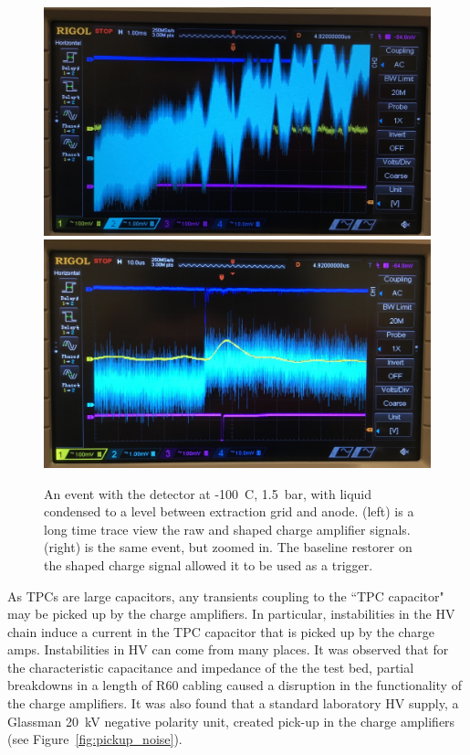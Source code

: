  \begin{figure}[htbp]
\begin{center}
\includegraphics[width = \halffig, keepaspectratio]{figures/testbed/baseline_wander.jpg}
\includegraphics[width = \halffig, keepaspectratio]{figures/testbed/baseline_wander_zoom.jpg}
\caption{An event with the detector at  -100~C, 1.5~bar, with liquid condensed to a level between extraction grid and anode. (left) is a long time trace view the raw and shaped charge amplifier signals. (right) is the same event, but zoomed in. The baseline restorer on the shaped charge signal allowed it to be used as a trigger.}
\label{fig:amp_noise2}
\end{center}
\end{figure}


As \ac{TPC}s are large capacitors, any transients coupling to the ``\ac{TPC} capacitor" may be picked up by the charge amplifiers. In particular, instabilities in the \ac{HV} chain induce a current in the \ac{TPC} capacitor that is picked up by the charge amps. Instabilities in \ac{HV} can come from many places. It was observed that for the characteristic capacitance and impedance of the the test bed, partial breakdowns in a length of R60 cabling caused a disruption in the functionality of the charge amplifiers. It was also found that a standard laboratory \ac{HV} supply, a Glassman 20~kV negative polarity unit, created pick-up in the charge amplifiers (see Figure~\ref{fig:pickup_noise}).  

